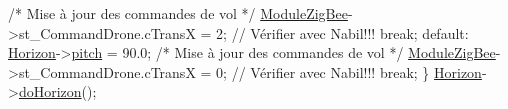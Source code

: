 \begin{DoxyCode}
            \textcolor{comment}{/* Mise à jour des commandes de vol */}
            \hyperlink{classQBase_a466b6191fec7cd0029dfc547a5437752}{ModuleZigBee}->st\_CommandDrone.cTransX = 2;    \textcolor{comment}{//
      Vérifier avec Nabil!!!}
            \textcolor{keywordflow}{break};
        \textcolor{keywordflow}{default}:
            \hyperlink{classQBase_ae4a8b78621695d9a61c311d422824a8d}{Horizon}->\hyperlink{classqAttitudeIndicator_ae0df6492b15cc2d3f51c3de0e6dd08bd}{pitch} = 90.0;
            \textcolor{comment}{/* Mise à jour des commandes de vol */}
            \hyperlink{classQBase_a466b6191fec7cd0029dfc547a5437752}{ModuleZigBee}->st\_CommandDrone.cTransX = 0;    \textcolor{comment}{//
      Vérifier avec Nabil!!!}
            \textcolor{keywordflow}{break};
        \}
        \hyperlink{classQBase_ae4a8b78621695d9a61c311d422824a8d}{Horizon}->\hyperlink{classqAttitudeIndicator_a7d4e7b19bc493de63a91b0e0480c24e2}{doHorizon}();


\end{DoxyCode}
